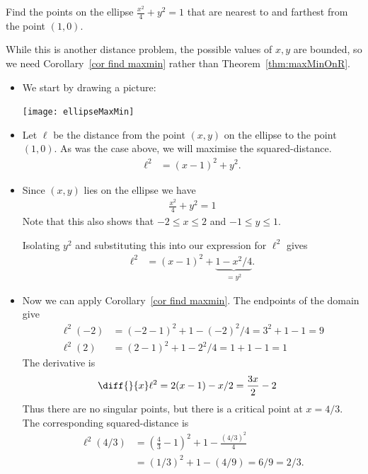 \begin{eg}\label{APPglobalMaxMinDD}
Find the points on the ellipse $\frac{x^2}{4}+y^2=1$ that are nearest
to and farthest from the point $(1,0)$.


\soln While this is another distance problem, the possible values of $x,y$ are bounded,
so we need Corollary~\ref{cor find maxmin} rather than Theorem~\ref{thm:maxMinOnR}.
\begin{itemize}
 \item We start by drawing a picture:
\begin{efig}
\begin{center}
   \texttt{[image: ellipseMaxMin]}
\end{center}
\end{efig}
\item Let $\ell$ be the distance from the point $(x,y)$ on the ellipse to the point
$(1,0)$. As was the case above, we will maximise the squared-distance.
\begin{align*}
  \ell^2 &= (x-1)^2 + y^2.
\end{align*}
\item Since $(x,y)$ lies on the ellipse we have
\begin{align*}
\frac{x^2}{4}+y^2=1
\end{align*}
Note that this also shows that $-2 \leq x \leq 2$ and $-1 \leq y \leq 1$.


Isolating $y^2$ and substituting this into our expression for $\ell^2$ gives
\begin{align*}
  \ell^2 &= (x-1)^2 + \underbrace{1-x^2/4}_{=y^2}.
\end{align*}

\item Now we can apply Corollary~\ref{cor find maxmin}. The endpoints of the domain give
\begin{align*}
  \ell^2(-2) &= (-2-1)^2 + 1 - (-2)^2/4 = 3^2+1-1 = 9\\
  \ell^2(2) &= (2-1)^2 + 1 - 2^2/4 = 1+1-1 = 1
\end{align*}
The derivative is
\begin{align*}
  \diff{}{x} \ell^2 &= 2(x-1) - x/2 = \frac{3x}{2} - 2
\end{align*}
Thus there are no singular points, but there is a critical point at $x = 4/3$. The
corresponding squared-distance is
\begin{align*}
  \ell^2(4/3) &= \left( \frac{4}{3}-1\right)^2 +1 - \frac{(4/3)^2}{4} \\
  &= (1/3)^2 + 1 - (4/9) = 6/9 = 2/3.
\end{align*}


\end{itemize}
\end{eg}
